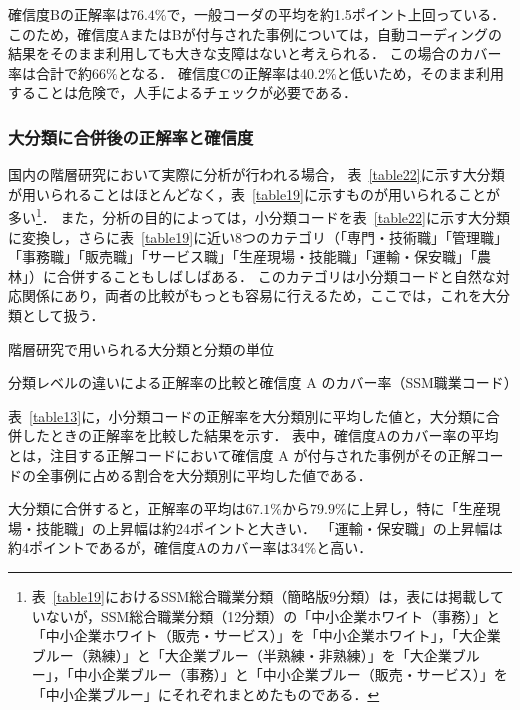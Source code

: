 \documentclass[japanese]{jnlp_1.4}
\begin{document}
確信度Bの正解率は$76.4\%$で，一般コーダの平均を約1.5ポイント上回っている．
このため，確信度AまたはBが付与された事例については，自動コーディングの結果をそのまま利用しても大きな支障はないと考えられる．
この場合のカバー率は合計で約$66\%$となる．
確信度Cの正解率は$40.2\%$と低いため，そのまま利用することは危険で，人手によるチェックが必要である．


\subsubsection{大分類に合併後の正解率と確信度}

国内の階層研究において実際に分析が行われる場合，
\pagebreak
表~\ref{table22}に示す大分類が用いられることはほとんどなく，表~\ref{table19}に示すものが用いられることが多い\footnote{表~\ref{table19}におけるSSM総合職業分類（簡略版9分類）は，表には掲載していないが，SSM総合職業分類（12分類）の「中小企業ホワイト（事務）」と「中小企業ホワイト（販売・サービス）」を「中小企業ホワイト」，「大企業ブルー（熟練）」と「大企業ブルー（半熟練・非熟練）」を「大企業ブルー」，「中小企業ブルー（事務）」と「中小企業ブルー（販売・サービス）」を「中小企業ブルー」にそれぞれまとめたものである．}．
また，分析の目的によっては，小分類コードを表~\ref{table22}に示す大分類に変換し，さらに表~\ref{table19}に近い8つのカテゴリ（「専門・技術職」「管理職」「事務職」「販売職」「サービス職」「生産現場・技能職」「運輸・保安職」「農林」）に合併することもしばしばある．
このカテゴリは小分類コードと自然な対応関係にあり，両者の比較がもっとも容易に行えるため，ここでは，これを大分類として扱う． 

\begin{table}[b]
\caption{階層研究で用いられる大分類と分類の単位}
\label{table19}

\end{table}
\begin{table}[b]
\caption{分類レベルの違いによる正解率の比較と確信度 A のカバー率（SSM職業コード）}
\label{table13}

\vspace{-0.5\Cvs}
\end{table}


表~\ref{table13}に，小分類コードの正解率を大分類別に平均した値と，大分類に合併したときの正解率を比較した結果を示す．
表中，確信度Aのカバー率の平均とは，注目する正解コードにおいて確信度 A が付与された事例がその正解コードの全事例に占める割合を大分類別に平均した値である．

大分類に合併すると，正解率の平均は$67.1\%$から$79.9\%$に上昇し，特に「生産現場・技能職」の上昇幅は約24ポイントと大きい．
「運輸・保安職」の上昇幅は約4ポイントであるが，確信度Aのカバー率は$34\%$と高い．
\end{document}
